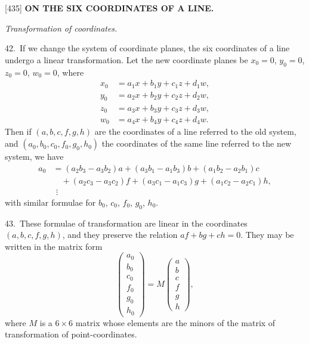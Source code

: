 \documentclass[12pt,a4paper]{article}
\newcommand{\paperref}[1]{\textup{[#1]}}
\theoremstyle{definition}
\begin{document}
\newpage
\setcounter{page}{82}

\noindent\paperref{435}\quad
\textbf{ON THE SIX COORDINATES OF A LINE.}

\textit{Transformation of coordinates.}

42.~If we change the system of coordinate planes, the six coordinates of a line undergo a linear transformation. Let the new coordinate planes be $x_0 = 0$, $y_0 = 0$, $z_0 = 0$, $w_0 = 0$, where
\begin{align*}
x_0 &= a_1 x + b_1 y + c_1 z + d_1 w,\\
y_0 &= a_2 x + b_2 y + c_2 z + d_2 w,\\
z_0 &= a_3 x + b_3 y + c_3 z + d_3 w,\\
w_0 &= a_4 x + b_4 y + c_4 z + d_4 w.
\end{align*}
Then if $(a, b, c, f, g, h)$ are the coordinates of a line referred to the old system, and $(a_0, b_0, c_0, f_0, g_0, h_0)$ the coordinates of the same line referred to the new system, we have
\begin{align*}
a_0 &= (a_2 b_3 - a_3 b_2) a + (a_3 b_1 - a_1 b_3) b + (a_1 b_2 - a_2 b_1) c\\
&\quad + (a_2 c_3 - a_3 c_2) f + (a_3 c_1 - a_1 c_3) g + (a_1 c_2 - a_2 c_1) h,\\
&\ \,\vdots
\end{align*}
with similar formulae for $b_0$, $c_0$, $f_0$, $g_0$, $h_0$.

43.~These formulae of transformation are linear in the coordinates $(a, b, c, f, g, h)$, and they preserve the relation $af + bg + ch = 0$. They may be written in the matrix form
\[
\begin{pmatrix} a_0 \\ b_0 \\ c_0 \\ f_0 \\ g_0 \\ h_0 \end{pmatrix}
= M
\begin{pmatrix} a \\ b \\ c \\ f \\ g \\ h \end{pmatrix},
\]
where $M$ is a $6 \times 6$ matrix whose elements are the minors of the matrix of transformation of point-coordinates.

\newpage
\setcounter{page}{83}
\end{document}
